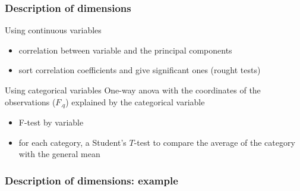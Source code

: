 \begin{frame}[fragile]
\frametitle{Description of  dimensions}
  
  \begin{block}{Using continuous variables}
    \begin{itemize}
      \item correlation between variable and the principal components
      \item sort correlation coefficients and give significant ones (rought tests)
    \end{itemize}
  \end{block}
  
  \begin{block}{Using categorical variables}
    One-way anova with the coordinates of the observations ($F_{.q}$) explained by the categorical variable
    \begin{itemize}
      \item F-test by variable
      \item for each category, a Student's $T$-test to compare the average of the category with the general mean
    \end{itemize}
  \end{block}

\end{frame}

\begin{frame}
\frametitle{Description of  dimensions: example}

\begin{knitrout}
\color{fgcolor}
\end{knitrout}

\end{frame}
